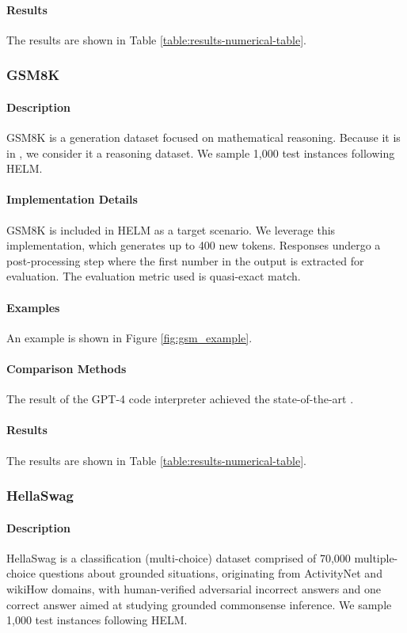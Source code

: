 \paragraph{Results} The results are shown in Table \ref{table:results-numerical-table}.

\subsubsection{GSM8K}
\paragraph{Description} GSM8K \citep{cobbe2021training} is a generation dataset focused on mathematical reasoning. Because it is in \citet{kojima2023large}, we consider it a reasoning dataset. We sample 1,000 test instances following HELM.

\paragraph{Implementation Details} 
GSM8K is included in HELM as a target scenario. We leverage this implementation, which generates up to 400 new tokens. Responses undergo a post-processing step where the first number in the output is extracted for evaluation. The evaluation metric used is quasi-exact match.

\paragraph{Examples} An example is shown in Figure \ref{fig:gsm_example}.

\paragraph{Comparison Methods}
The result of the GPT-4 code interpreter achieved the state-of-the-art \citep{zhou2023solving}.

\paragraph{Results} The results are shown in Table \ref{table:results-numerical-table}.

\subsubsection{HellaSwag}
\paragraph{Description} HellaSwag \citep{zellers2019hellaswag} is a classification (multi-choice) dataset comprised of 70,000 multiple-choice questions about grounded situations, originating from ActivityNet and wikiHow domains, with human-verified adversarial incorrect answers and one correct answer aimed at studying grounded commonsense inference. We sample 1,000 test instances following HELM.

